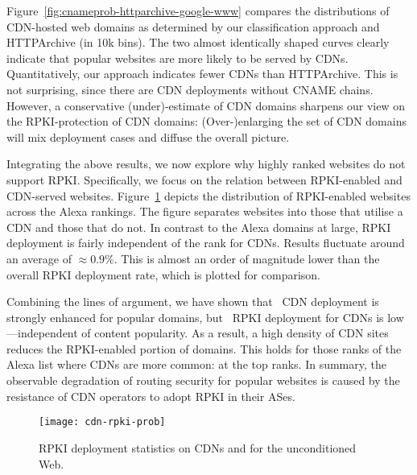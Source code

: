 Figure~\ref{fig:cnameprob-httparchive-google-www} compares the distributions of 
CDN-hosted web domains as determined by our classification approach and  
HTTPArchive (in 10k bins). The two almost identically shaped curves clearly
indicate that popular websites are more likely to be served by CDNs. 
Quantitatively, our approach indicates fewer CDNs than HTTPArchive. This is not surprising, since there are CDN deployments without CNAME chains. However, a conservative (un\-der)-estimate of CDN domains sharpens our view on the RPKI-protection of CDN domains: (Over-)en\-larg\-ing the set of CDN domains will mix deployment cases and diffuse the overall picture.

Integrating the above results, we now explore why highly ranked websites do not support RPKI. Specifically, we focus on the relation between RPKI-enabled and CDN-served websites.
Figure~\ref{fig:rpki-cdn-prob} depicts the distribution of RPKI-enabled websites across the Alexa rankings. The figure separates websites into those that utilise a CDN and those that do not.
In contrast to the Alexa domains at large, RPKI deployment is fairly independent of the rank for CDNs. Results fluctuate around an average of $\approx 0.9\%$. This is almost an order of magnitude lower than the overall RPKI deployment rate, which is plotted for comparison.


Combining the lines of argument, we have shown that \one~CDN deployment is strongly enhanced for popular domains, but \two~RPKI deployment for CDNs is low---independent of content popularity. As a result, a high density of CDN sites reduces the RPKI-enabled portion of domains.
This holds for those ranks of the Alexa list where CDNs are more common: at the top ranks.
In summary, the observable degradation of routing security for popular websites is caused by the resistance of CDN operators to adopt RPKI in their ASes.




\begin{figure}
  \texttt{[image: cdn-rpki-prob]}
  \caption{RPKI deployment statistics on CDNs and for the unconditioned Web.}
  \label{fig:rpki-cdn-prob}
\end{figure}

